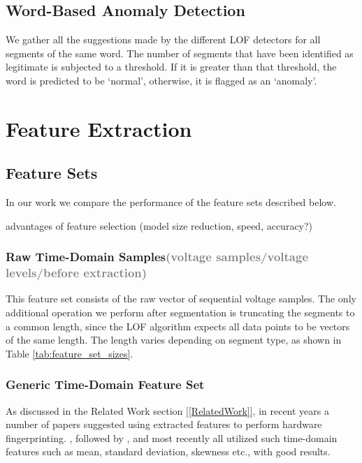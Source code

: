 \documentclass[conference]{IEEEtran}
\begin{document}
\subsection{Word-Based Anomaly Detection}
  We gather all the suggestions made by the different LOF detectors for all segments of the same word. The number of segments that have been identified as legitimate is subjected to a threshold. If it is greater than that threshold, the word is predicted to be `normal', otherwise, it is flagged as an `anomaly'.
  



\section{Feature Extraction}

\subsection{Feature Sets}
  In our work we compare the performance of the feature sets described below.
  
  \color{gray}
  advantages of feature selection (model size reduction, speed, accuracy?)
  \color{black}
  
\subsubsection{Raw Time-Domain Samples\textcolor{gray}{(voltage samples/voltage levels/before extraction)}}

  This feature set consists of the raw vector of sequential voltage samples. The only additional operation we perform after segmentation is truncating the segments to a common length, since the LOF algorithm expects all data points to be vectors of the same length. The length varies depending on segment type, as shown in Table \ref{tab:feature_set_sizes}.
  
\subsubsection{Generic Time-Domain Feature Set}
  As discussed in the Related Work section [\ref{RelatedWork}], in recent years a number of papers suggested using extracted features to perform hardware fingerprinting. \cite{dey2014accelprint}, followed by \cite{choi2018identifying}, \cite{choi2018voltageids} and most recently \cite{kneib2018scission} all utilized such time-domain features such as mean, standard deviation, skewness etc., with good results.
  
\end{document}
